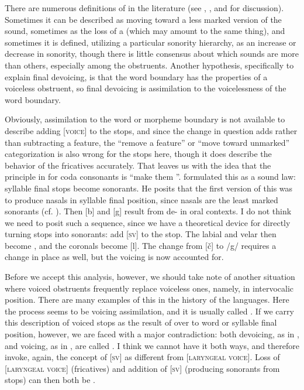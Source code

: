 \documentclass[output=paper]{LSP/langsci}
\begin{document}
There are numerous definitions of  in the literature (see \citealt{Honeybone2008}, \citealt{Harris2009}, and \citealt{Szigetvari2008} for discussion). Sometimes it can be described as moving toward a less marked version of the sound, sometimes as the loss of a  (which may amount to the same thing), and sometimes it is defined, utilizing a particular sonority hierarchy, as an increase or decrease in sonority, though there is little consensus about which sounds are more  than others, especially among the obstruents. Another hypothesis, specifically to explain final devoicing, is that the word boundary has the properties of a voiceless obstruent, so final devoicing is assimilation to the voicelessness of the word boundary.

Obviously, assimilation to the word or morpheme boundary is not available to describe adding [\textsc{voice}] to the  stops, and since the change in question adds rather than subtracting a feature, the ``remove a feature'' or ``move toward unmarked'' categorization is also wrong for the stops here, though it does describe the behavior of the fricatives accurately. That leaves us with the idea that the principle in  for coda consonants is ``make them ''. \citet[5]{Rankin2001} formulated this as a sound law: syllable final stops become sonorants. He posits that the first version of this  was to produce nasals in syllable final position, since nasals are the least marked sonorants (cf. \citealt{Rice1993}). Then [b] and [g] result from de- in oral contexts. I do not think we need to posit such a sequence, since we have a theoretical device for directly turning stops into sonorants: add [\textsc{sv}] to the stop. The labial and velar then become , and the coronals become [l]. The change from [\v{c}] to /g/ requires a change in place as well, but the voicing is now accounted for.

Before we accept this analysis, however, we should take note of another situation where voiced obstruents frequently replace voiceless ones, namely, in intervocalic position. There are many examples of this in the history of the  languages. Here the process seems to be voicing assimilation, and it is usually called . If we carry this description of voiced stops as the result of  over to word or syllable final position, however, we are faced with a major contradiction: both devoicing, as in , and voicing, as in , are called . I think we cannot have it both ways, and therefore invoke, again, the concept of [\textsc{sv}] as different from [\textsc{laryngeal voice}]. Loss of [\textsc{laryngeal voice}] (fricatives) and addition of [\textsc{sv}] (producing sonorants from stops) can then both be .
\end{document}
